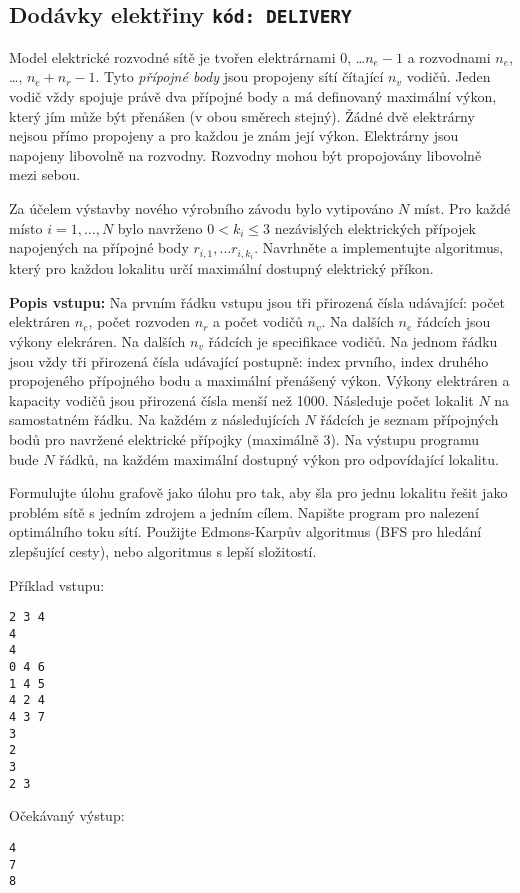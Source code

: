 \documentclass[a4paper,10pt]{article}
\begin{document}
\subsection{Dodávky elektřiny \hfill{\tt kód: DELIVERY}}
Model elektrické rozvodné sítě je tvořen elektrárnami $0$, \dots $n_e-1$  a rozvodnami $n_e$, \dots, $n_e + n_r-1$. Tyto \emph{přípojné body} jsou propojeny sítí čítající  $n_v$ vodičů. Jeden vodič vždy spojuje právě dva 
přípojné body a má definovaný maximální výkon, který jím může být přenášen (v obou směrech stejný). 
Žádné dvě elektrárny nejsou přímo propojeny a pro každou je znám její výkon. 
Elektrárny jsou napojeny libovolně na rozvodny. Rozvodny mohou být propojovány libovolně mezi sebou. 

Za účelem výstavby nového výrobního závodu bylo vytipováno $N$ míst. Pro každé místo $i=1,\dots ,N$ bylo navrženo $0 < k_i \le 3$ nezávislých elektrických přípojek napojených na přípojné body $r_{i,1}, \dots r_{i,k_i}$.
Navrhněte a implementujte algoritmus, který pro každou lokalitu určí maximální dostupný elektrický příkon.

{\bf Popis vstupu: }
Na prvním řádku vstupu jsou tři přirozená čísla udávající: počet elektráren $n_e$, počet rozvoden $n_r$  a počet vodičů $n_v$. Na dalších $n_e$ řádcích jsou výkony elekráren. Na dalších $n_v$ řádcích je specifikace vodičů. Na jednom řádku jsou vždy tři přirozená čísla udávající postupně: index prvního, index druhého propojeného přípojného bodu a maximální přenášený výkon.
Výkony elektráren a kapacity vodičů jsou přirozená čísla menší než 1000.
Následuje počet lokalit $N$ na samostatném řádku. Na každém z následujících $N$ řádcích 
je seznam přípojných bodů pro navržené elektrické přípojky (maximálně 3).
Na výstupu programu bude $N$ řádků, na každém maximální dostupný výkon pro odpovídající lokalitu.

Formulujte úlohu grafově jako úlohu pro tak, aby šla pro jednu lokalitu řešit jako problém sítě s jedním zdrojem a jedním cílem. Napište program pro nalezení optimálního toku sítí. Použijte Edmons-Karpův algoritmus (BFS pro hledání zlepšující cesty), nebo algoritmus s lepší složitostí.


Příklad vstupu:
\begin{verbatim}
2 3 4
4
4
0 4 6
1 4 5
4 2 4
4 3 7
3
2
3
2 3
\end{verbatim}

Očekávaný výstup:
\begin{verbatim}
4
7
8
\end{verbatim}
\end{document}
